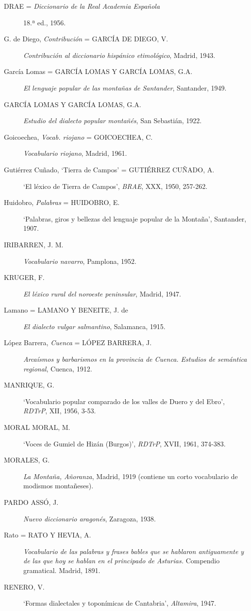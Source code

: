 \begin{description}
\item[DRAE = \textit{Diccionario de la Real Academia Española}] 18.ª ed., 1956.
\item[G. de Diego, \textit{Contribución} = GARCÍA DE DIEGO, V.] \textit{Contribución al diccionario hispánico etimológico}, Madrid, 1943. 
\item[García Lomas = GARCÍA LOMAS Y GARCÍA LOMAS, G.A.] \textit{El lenguaje popular de las montañas de Santander}, Santander, 1949.
\item[GARCÍA LOMAS Y GARCÍA LOMAS, G.A.] \textit{Estudio del dialecto popular montañés}, San Sebastián, 1922.
\item[Goicoechea, \textit{Vocab. riojano} = GOICOECHEA, C.]  \textit{Vocabulario riojano}, Madrid, 1961.
\item[Gutiérrez Cuñado, `Tierra de Campos' = GUTIÉRREZ CUÑADO, A.] `El léxico de Tierra de Campos', \textit{BRAE}, XXX, 1950, 257-262.
\item[Huidobro, \textit{Palabras} = HUIDOBRO, E.] `Palabras, giros y bellezas del lenguaje popular de la Montaña', Santander, 1907.   
\item[IRIBARREN, J. M.] \textit{Vocabulario navarro}, Pamplona, 1952.  
\item[KRUGER, F.] \textit{El léxico rural del noroeste peninsular}, Madrid, 1947. 
\item[Lamano = LAMANO Y BENEITE, J. de] \textit{El dialecto vulgar salmantino}, Salamanca, 1915.   
\item[López Barrera, \textit{Cuenca} = LÓPEZ BARRERA, J.] \textit{Arcaísmos y barbarismos en la provincia de Cuenca. Estudios de semántica regional}, Cuenca, 1912. 
\item[MANRIQUE, G.] `Vocabulario popular comparado de los valles de Duero y del Ebro', \textit{RDTrP}, XII, 1956, 3-53. 
\item[MORAL MORAL, M.] `Voces de Gumiel de Hizán (Burgos)', \textit{RDTrP}, XVII, 1961, 374-383.
\item[MORALES, G.] \textit{La Montaña, Añoranza}, Madrid, 1919 (contiene un corto vocabulario de modismos montañeses).  
\item[PARDO ASSÓ, J.] \textit{Nuevo diccionario aragonés}, Zaragoza, 1938. 
\item[Rato = RATO Y HEVIA, A.] \textit{Vocabulario de las palabras y frases bables que se hablaron antiguamente y de las que hoy se hablan en el principado de Asturias.} Compendio gramatical. Madrid, 1891. 
\item[RENERO, V.] `Formas dialectales y toponímicas de Cantabria', \textit{Altamira}, 1947.  

\end{description}
